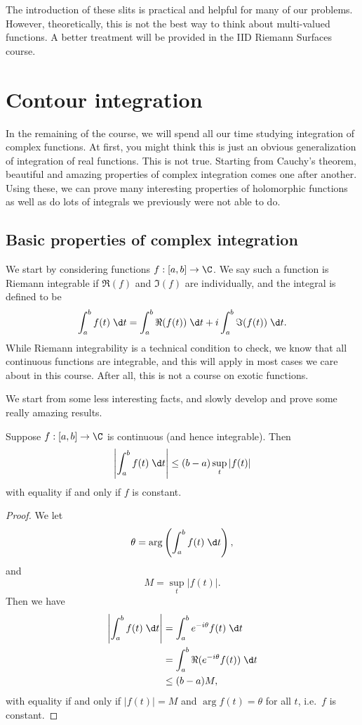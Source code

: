 \documentclass[a4paper]{article}
\begin{document}
The introduction of these slits is practical and helpful for many of our problems. However, theoretically, this is not the best way to think about multi-valued functions. A better treatment will be provided in the IID Riemann Surfaces course.

\section{Contour integration}
In the remaining of the course, we will spend all our time studying integration of complex functions. At first, you might think this is just an obvious generalization of integration of real functions. This is not true. Starting from Cauchy's theorem, beautiful and amazing properties of complex integration comes one after another. Using these, we can prove many interesting properties of holomorphic functions as well as do lots of integrals we previously were not able to do.

\subsection{Basic properties of complex integration}
We start by considering functions $f: [a, b] \to \C$. We say such a function is Riemann integrable if $\Re(f)$ and $\Im (f)$ are individually, and the integral is defined to be
\[
  \int_a^b f(t) \;\d t = \int_a^b \Re(f(t))\;\d t + i \int_a^b \Im(f(t))\;\d t.
\]
While Riemann integrability is a technical condition to check, we know that all continuous functions are integrable, and this will apply in most cases we care about in this course. After all, this is not a course on exotic functions.

We start from some less interesting facts, and slowly develop and prove some really amazing results.
\begin{lemma}
  Suppose $f: [a, b] \to \C$ is continuous (and hence integrable). Then
  \[
    \left|\int_a^b f(t)\;\d t\right| \leq (b - a) \sup_t |f(t)|
  \]
  with equality if and only if $f$ is constant.
\end{lemma}

\begin{proof}
  We let
  \[
    \theta = \arg\left(\int_a^b f(t)\;\d t\right),
  \]
  and
  \[
    M = \sup_t |f(t)|.
  \]
  Then we have
  \begin{align*}
    \left|\int_a^b f(t)\;\d t\right| &= \int_a^b e^{-i\theta} f(t)\;\d t\\
    &= \int_a^b \Re(e^{-i\theta} f(t))\;\d t\\
    &\leq (b - a) M,
  \end{align*}
  with equality if and only if $|f(t)| =M$ and $\arg f(t) = \theta$ for all $t$, i.e.\ $f$ is constant.
\end{proof}
\end{document}
